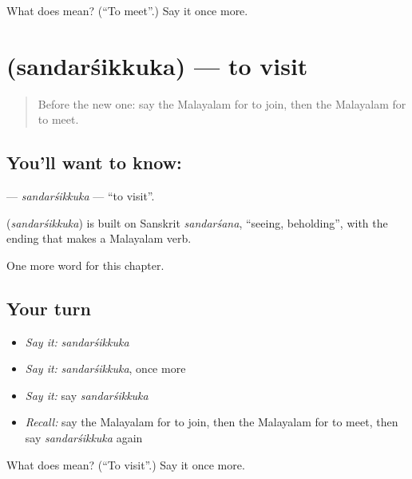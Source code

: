 \begin{tcolorbox}[breakable,colback=teal!4,colframe=teal!35!black,title={Before you move on}]
What does  mean? (\textquotedblleft{}To meet\textquotedblright{}.) Say it once more.
\end{tcolorbox}
\section[\texorpdfstring{\ml{സന്ദർശിക്കുക} (sandarśikkuka)}{സന്ദർശിക്കുക (sandarśikkuka)}]{ (sandarśikkuka) — to visit}

\label{lesson:ML-C305-sandarsikkuka}



\begin{quote}
Before the new one: say the Malayalam for to join, then the Malayalam for to meet.
\end{quote}

\subsection*{You'll want to know: }
\textbf{} — \emph{sandarśikkuka} — \textquotedblleft{}to visit\textquotedblright{}.

\begin{cousinweb}
\textbf{} (\emph{sandarśikkuka}) is built on Sanskrit \emph{sandarśana}, \textquotedblleft{}seeing, beholding\textquotedblright{}, with the ending that makes a Malayalam verb.
\end{cousinweb}

\begin{grammarlens}[title={What you've built}]
One more word for this chapter.
\end{grammarlens}

\subsection*{Your turn}
\begin{itemize}
\raggedright
  \item \emph{Say it:} \emph{sandarśikkuka}
  \item \emph{Say it:} \emph{sandarśikkuka}, once more
  \item \emph{Say it:} say \emph{sandarśikkuka}
  \item \emph{Recall:} say the Malayalam for to join, then the Malayalam for to meet, then say \emph{sandarśikkuka} again
\end{itemize}

\begin{tcolorbox}[breakable,colback=teal!4,colframe=teal!35!black,title={Before you move on}]
What does  mean? (\textquotedblleft{}To visit\textquotedblright{}.) Say it once more.
\end{tcolorbox}
